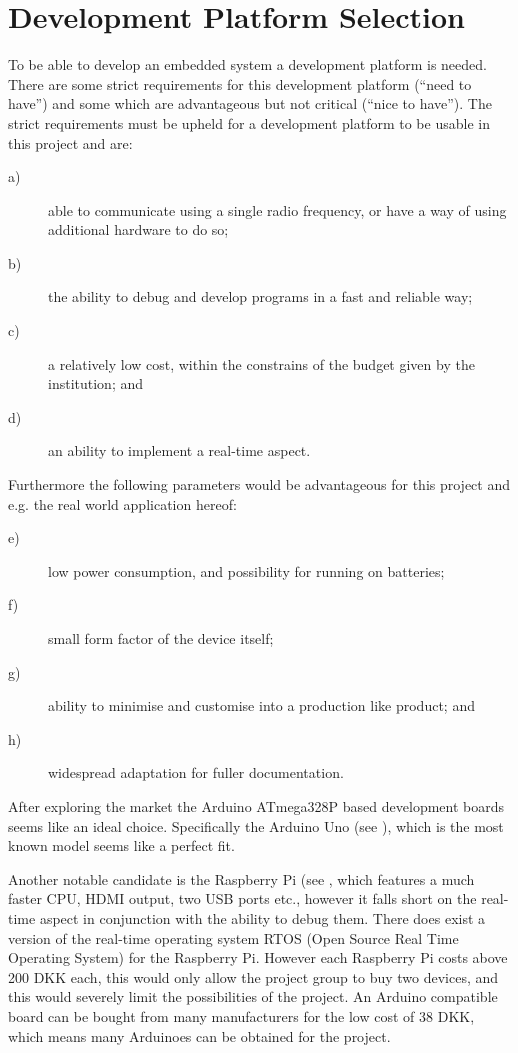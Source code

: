 
\section{Development Platform Selection}
To be able to develop an embedded system a development platform is needed. 
There are some strict requirements for this development platform (``need to have'') and some which are advantageous but not critical (``nice to have'').
The strict requirements must be upheld for a development platform to be usable in this project and are:
\begin{description}
\item[a)] able to communicate using a single radio frequency, or have a way of using additional hardware to do so;
\item[b)] the ability to debug and develop programs in a fast and reliable way;
\item[c)] a relatively low cost, within the constrains of the budget given by the institution;
and
\item[d)] an ability to implement a real-time aspect.
\end{description}

Furthermore the following parameters would be advantageous for this project and e.g. the real world application hereof:
\begin{description}
\item[e)] low power consumption, and possibility for running on batteries;
\item[f)] small form factor of the device itself;
\item[g)] ability to minimise and customise into a production like product;
and
\item[h)] widespread adaptation for fuller documentation.
\end{description}

\bigskip
After exploring the market the Arduino ATmega328P based development boards seems like an ideal choice.
Specifically the Arduino Uno (see \cite{ArduinoUNO}), which is the most known model seems like a perfect fit.

Another notable candidate is the Raspberry Pi (see \cite{RaspberryPI}, which features a much faster CPU, HDMI output, two USB ports etc., however it falls short on the real-time aspect in conjunction with the ability to debug them. 
There does exist a version of the real-time operating system RTOS (Open Source Real Time Operating System) for the Raspberry Pi.
However each Raspberry Pi costs above 200 DKK each, this would only allow the project group to buy two devices, and this would severely limit the possibilities of the project.
An Arduino compatible board can be bought from many manufacturers for the low cost of 38 DKK, which means many Arduinoes can be obtained for the project.

